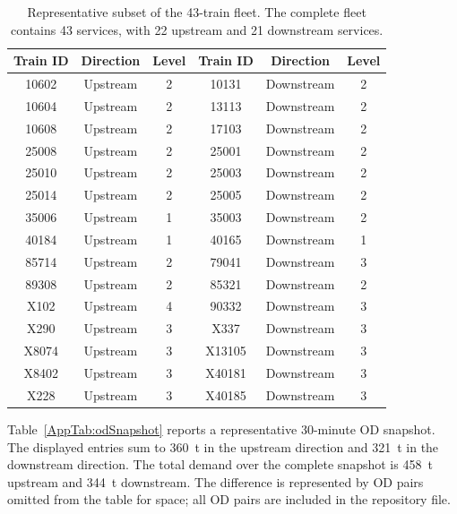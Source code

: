 \documentclass[11pt]{article}
\begin{document}
\begin{table}[!htbp]
	\centering
	\small
	\setlength{\tabcolsep}{3pt}
	\caption{Representative subset of the 43-train fleet. The complete fleet contains 43 services, with 22 upstream and 21 downstream services.\label{AppTab:trainSubset}}
	\begin{tabular}{ccc|ccc}
		\toprule
		\textbf{Train ID} & \textbf{Direction} & \textbf{Level} & \textbf{Train ID} & \textbf{Direction} & \textbf{Level} \\
		\midrule
		10602 & Upstream & 2 & 10131 & Downstream & 2 \\
		10604 & Upstream & 2 & 13113 & Downstream & 2 \\
		10608 & Upstream & 2 & 17103 & Downstream & 2 \\
		25008 & Upstream & 2 & 25001 & Downstream & 2 \\
		25010 & Upstream & 2 & 25003 & Downstream & 2 \\
		25014 & Upstream & 2 & 25005 & Downstream & 2 \\
		35006 & Upstream & 1 & 35003 & Downstream & 2 \\
		40184 & Upstream & 1 & 40165 & Downstream & 1 \\
		85714 & Upstream & 2 & 79041 & Downstream & 3 \\
		89308 & Upstream & 2 & 85321 & Downstream & 2 \\
		X102  & Upstream & 4 & 90332 & Downstream & 3 \\
		X290  & Upstream & 3 & X337  & Downstream & 3 \\
		X8074 & Upstream & 3 & X13105 & Downstream & 3 \\
		X8402 & Upstream & 3 & X40181 & Downstream & 3 \\
		X228  & Upstream & 3 & X40185 & Downstream & 3 \\
		\bottomrule
	\end{tabular}
\end{table}

Table~\ref{AppTab:odSnapshot} reports a representative 30-minute OD snapshot. The displayed entries sum to 360~t in the upstream direction and 321~t in the downstream direction. The total demand over the complete snapshot is 458~t upstream and 344~t downstream. The difference is represented by OD pairs omitted from the table for space; all OD pairs are included in the repository file.
\end{document}
